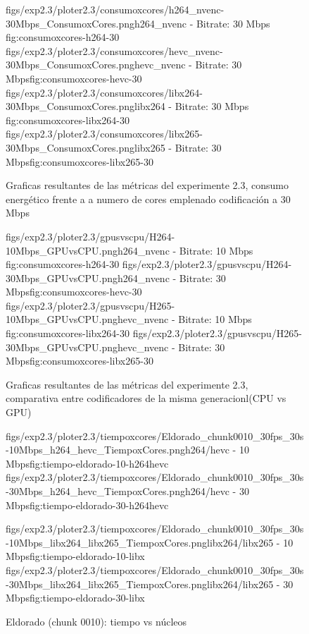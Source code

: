      \begin{figure}[H]
      \centering
      \small
      \dosubfigs
      {figs/exp2.3/ploter2.3/consumoxcores/h264_nvenc-30Mbps_ConsumoxCores.png}{h264\_nvenc - Bitrate: 30 Mbps }{fig:consumoxcores-h264-30}
      {figs/exp2.3/ploter2.3/consumoxcores/hevc_nvenc-30Mbps_ConsumoxCores.png}{hevc\_nvenc - Bitrate: 30 Mbps}{fig:consumoxcores-hevc-30}
      \dosubfigs
      {figs/exp2.3/ploter2.3/consumoxcores/libx264-30Mbps_ConsumoxCores.png}{libx264 - Bitrate: 30 Mbps }{fig:consumoxcores-libx264-30}
      {figs/exp2.3/ploter2.3/consumoxcores/libx265-30Mbps_ConsumoxCores.png}{libx265 - Bitrate: 30 Mbps}{fig:consumoxcores-libx265-30}
      \caption{Graficas resultantes de las métricas del experimente 2.3, consumo energético frente a a numero de cores emplenado codificación a 30 Mbps}
      \label{fig-group:consumoxcores-30mps}
     \end{figure}

  \begin{figure}[H]
   \centering
   \small
   \dosubfigs
   {figs/exp2.3/ploter2.3/gpusvscpu/H264-10Mbps_GPUvsCPU.png}{h264\_nvenc - Bitrate: 10 Mbps }{fig:consumoxcores-h264-30}
   {figs/exp2.3/ploter2.3/gpusvscpu/H264-30Mbps_GPUvsCPU.png}{h264\_nvenc - Bitrate: 30 Mbps}{fig:consumoxcores-hevc-30}
   \dosubfigs
   {figs/exp2.3/ploter2.3/gpusvscpu/H265-10Mbps_GPUvsCPU.png}{hevc\_nvenc  - Bitrate: 10 Mbps }{fig:consumoxcores-libx264-30}
   {figs/exp2.3/ploter2.3/gpusvscpu/H265-30Mbps_GPUvsCPU.png}{hevc\_nvenc  - Bitrate: 30 Mbps}{fig:consumoxcores-libx265-30}
   \caption{Graficas resultantes de las métricas del experimente 2.3, comparativa entre codificadores de la misma generacionl(CPU vs GPU)}
   \label{fig-group:gpusvscpu-}
  \end{figure}


\begin{figure}[H]
  \centering
  \small
  \dosubfigs
    {figs/exp2.3/ploter2.3/tiempoxcores/Eldorado_chunk0010_30fps_30s-10Mbps_h264_hevc_TiempoxCores.png}{h264/hevc - 10 Mbps}{fig:tiempo-eldorado-10-h264hevc}
    {figs/exp2.3/ploter2.3/tiempoxcores/Eldorado_chunk0010_30fps_30s-30Mbps_h264_hevc_TiempoxCores.png}{h264/hevc - 30 Mbps}{fig:tiempo-eldorado-30-h264hevc}
  
  \dosubfigs
    {figs/exp2.3/ploter2.3/tiempoxcores/Eldorado_chunk0010_30fps_30s-10Mbps_libx264_libx265_TiempoxCores.png}{libx264/libx265 - 10 Mbps}{fig:tiempo-eldorado-10-libx}
    {figs/exp2.3/ploter2.3/tiempoxcores/Eldorado_chunk0010_30fps_30s-30Mbps_libx264_libx265_TiempoxCores.png}{libx264/libx265 - 30 Mbps}{fig:tiempo-eldorado-30-libx}
  \caption{Eldorado (chunk 0010): tiempo vs núcleos}
  \label{fig:tiempo-eldorado}
\end{figure}

